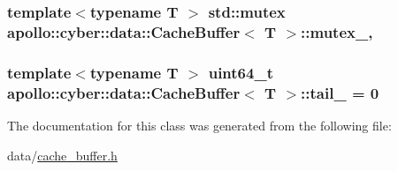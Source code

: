 \hypertarget{classapollo_1_1cyber_1_1data_1_1CacheBuffer_a6161b6de3bd9b4837491cd16a4cdb716}{
\subsubsection[{mutex\-\_\-}]{\setlength{\rightskip}{0pt plus 5cm}template$<$typename T $>$ std\-::mutex {\bf apollo\-::cyber\-::data\-::\-Cache\-Buffer}$<$ T $>$\-::mutex\-\_\-\hspace{0.3cm}{\ttfamily [mutable]}, {\ttfamily [private]}}}\label{classapollo_1_1cyber_1_1data_1_1CacheBuffer_a6161b6de3bd9b4837491cd16a4cdb716}
\hypertarget{classapollo_1_1cyber_1_1data_1_1CacheBuffer_ad293745c1a892594ae8c934a793c32ce}{
\subsubsection[{tail\-\_\-}]{\setlength{\rightskip}{0pt plus 5cm}template$<$typename T $>$ uint64\-\_\-t {\bf apollo\-::cyber\-::data\-::\-Cache\-Buffer}$<$ T $>$\-::tail\-\_\- = 0\hspace{0.3cm}{\ttfamily [private]}}}\label{classapollo_1_1cyber_1_1data_1_1CacheBuffer_ad293745c1a892594ae8c934a793c32ce}


The documentation for this class was generated from the following file\-:\begin{DoxyCompactItemize}
\item 
data/\hyperlink{cache__buffer_8h}{cache\-\_\-buffer.\-h}\end{DoxyCompactItemize}
